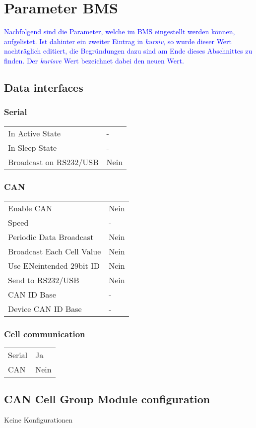 \chapter{Parameter BMS}\label{anh_bms}
\textcolor{blue}{Nachfolgend sind die Parameter, welche im BMS eingestellt werden können, aufgelistet. Ist dahinter ein zweiter Eintrag in \textit{kursiv}, so wurde dieser Wert nachträglich editiert, die Begründungen dazu sind am Ende dieses Abschnittes zu finden. Der \textit{kurisve} Wert bezeichnet dabei den neuen Wert.}
\section*{Data interfaces}
\subsection*{Serial}
\begin{tabular}{p{11cm}p{2cm}}
	In Active State & - \\
	In Sleep State & - \\
	Broadcast on RS232/USB & Nein
\end{tabular}

\subsection*{CAN}
\begin{tabular}{p{11cm}p{2cm}}
	Enable CAN & Nein \\
	Speed & - \\
	Periodic Data Broadcast & Nein \\
	Broadcast Each Cell Value & Nein \\
	Use ENeintended 29bit ID & Nein \\
	Send to RS232/USB & Nein \\
	CAN ID Base & - \\
	Device CAN ID Base & -
\end{tabular}

\subsection*{Cell communication}
\begin{tabular}{p{11cm}p{2cm}}
	Serial & Ja \\
	CAN & Nein
\end{tabular}

\section*{CAN Cell Group Module configuration}
Keine Konfigurationen

